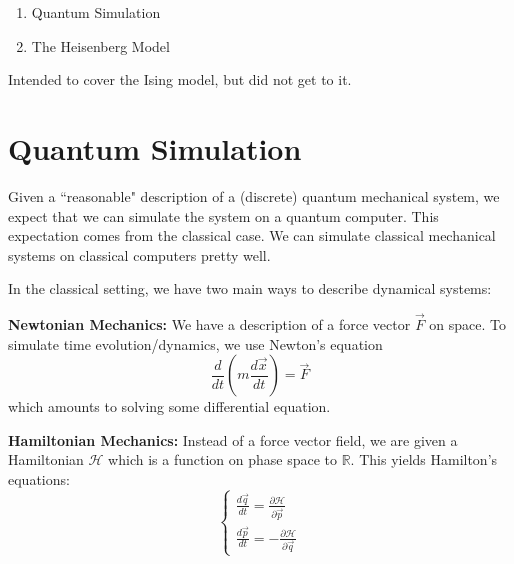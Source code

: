 \documentclass{article}
\begin{document}
\noindent
{}

\vspace{.3cm}

\begin{enumerate}
\item Quantum Simulation
\item The Heisenberg Model
\end{enumerate}
Intended to cover the Ising model, but did not get to it.

\section{Quantum Simulation}

Given a ``reasonable" description of a (discrete) quantum mechanical system, we expect that we can simulate the system on a quantum computer. This expectation comes from the classical case. We can simulate classical mechanical systems on classical computers pretty well.

\vspace{0.5cm}

In the classical setting, we have two main ways to describe dynamical systems:

\vspace{0.5cm}

\noindent\textbf{Newtonian Mechanics: } We have a description of a force vector $\vec{F}$ on space. To simulate time evolution/dynamics, we use Newton's equation $$\frac{d}{dt}\left (m\frac{d\vec{x}}{dt}\right ) = \vec{F}$$ which amounts to solving some differential equation.

\vspace{0.5cm}

\noindent\textbf{Hamiltonian Mechanics: } Instead of a force vector field, we are given a Hamiltonian $\mathcal H$ which is a function on phase space to $\mathbb R$. This yields Hamilton's equations: $$\left \{\begin{matrix}
     \frac{d\vec{q}}{dt} = \frac{\partial \mathcal H}{\partial \vec{p}}  \\
     \frac{d\vec{p}}{dt} = -\frac{\partial \mathcal H}{\partial \vec{q}} 
\end{matrix}\right .$$
\end{document}
